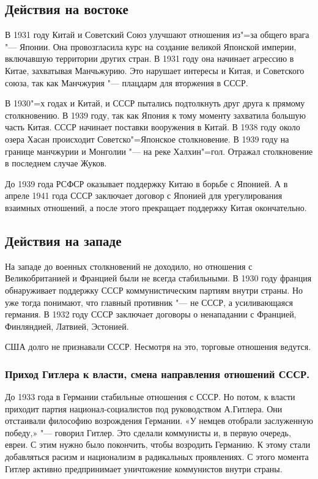 \subsection{Действия на востоке}

В 1931 году Китай и Советский Союз улучшают отношения из"=за общего врага "--- Японии. Она провозгласила курс на создание великой Японской империи, включавшую территории других стран. В 1931 году она начинает агрессию в Китае, захватывая Манчьжурию. Это нарушает интересы и Китая, и Советского союза, так как Манчжурия "--- плацдарм для вторжения в СССР. 

В 1930"=х годах и Китай, и СССР пытались подтолкнуть друг друга к прямому столкновению. В 1939 году, так как Япония к тому моменту захватила большую часть Китая. СССР начинает поставки вооружения в Китай. В 1938 году около озера Хасан происходит Советско"=Японское столкновение. В 1939 году на границе манчжурии и Монголии "--- на реке Халхин"=гол. Отражал столкновение в последнем случае Жуков.

До 1939 года РСФСР оказывает поддержку Китаю в борьбе с Японией. А в апреле 1941 года СССР заключает договор с Японией для урегулирования взаимных отношений, а после этого прекращает поддержку Китая окончательно.

\subsection{Действия на западе}

На западе до военных столкновений не доходило, но отношения с Великобританией и Францией были не всегда стабильными. В 1930 году франция обнаруживает поддержку СССР коммунистическим партиям внутри страны. Но уже тогда понимают, что главный противник "--- не СССР, а усиливающаяся германия. В 1932 году СССР заключает договоры о ненападании с Францией, Финляндией, Латвией, Эстонией.

США долго не признавали СССР. Несмотря на это, торговые отношения ведутся.

\subsubsection{\textbf{Приход Гитлера к власти, смена направления отношений СССР.}}

До 1933 года в Германии стабильные отношения с СССР. Но потом, к власти приходит партия национал-социалистов под руководством А.Гитлера. Они отстаивали философию возрождения Германии. «У немцев отобрали заслуженную победу,» "--- говорил Гитлер. Это сделали коммунисты и, в первую очередь, евреи. С этим нужно было покончить, чтобы возродить Германию. К этому стали добавляться расизм и национализм в радикальных проявлениях. С этого момента Гитлер активно предпринимает уничтожение коммунистов внутри страны. 

